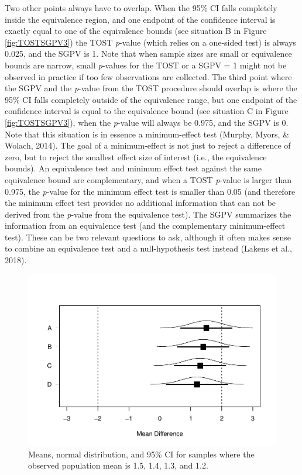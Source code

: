 \documentclass[,man,floatsintext]{apa6}
\begin{document}
Two other points always have to overlap. When the 95\% CI falls
completely inside the equivalence region, and one endpoint of the
confidence interval is exactly equal to one of the equivalence bounds
(see situation B in Figure \ref{fig:TOSTSGPV3}) the TOST \emph{p}-value
(which relies on a one-sided test) is always 0.025, and the SGPV is 1.
Note that when sample sizes are small or equivalence bounds are narrow,
small \emph{p}-values for the TOST or a SGPV = 1 might not be observed
in practice if too few observations are collected. The third point where
the SGPV and the \emph{p}-value from the TOST procedure should overlap
is where the 95\% CI falls completely outside of the equivalence range,
but one endpoint of the confidence interval is equal to the equivalence
bound (see situation C in Figure \ref{fig:TOSTSGPV3}), when the
\emph{p}-value will always be 0.975, and the SGPV is 0. Note that this
situation is in essence a minimum-effect test (Murphy, Myors, \& Wolach,
2014). The goal of a minimum-effect is not just to reject a difference
of zero, but to reject the smallest effect size of interest (i.e., the
equivalence bounds). An equivalence test and minimum effect test against
the same equivalence bound are complementary, and when a TOST
\emph{p}-value is larger than 0.975, the \emph{p}-value for the minimum
effect test is smaller than 0.05 (and therefore the minimum effect test
provides no additional information that can not be derived from the
\emph{p}-value from the equivalence test). The SGPV summarizes the
information from an equivalence test (and the complementary
minimum-effect test). These can be two relevant questions to ask,
although it often makes sense to combine an equivalence test and a
null-hypothesis test instead (Lakens et al., 2018).

\begin{figure}
\centering
\includegraphics{manuscript.R1_files/figure-latex/TOSTSGPV4-1.pdf}
\caption{\label{fig:TOSTSGPV4}Means, normal distribution, and 95\% CI for
samples where the observed population mean is 1.5, 1.4, 1.3, and 1.2.}
\end{figure}
\end{document}
